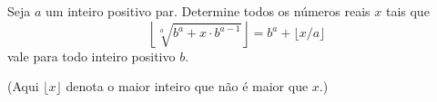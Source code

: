 Seja \(a\) um inteiro positivo par. Determine todos os números reais \(x\) tais que
\[
\left\lfloor \sqrt[a]{b^a + x \cdot b^{a-1}} \right\rfloor = b^a + \lfloor x/a \rfloor \tag{1}
\]
vale para todo inteiro positivo \(b\).

(Aqui \(\lfloor x \rfloor\) denota o maior inteiro que não é maior que \(x\).)
